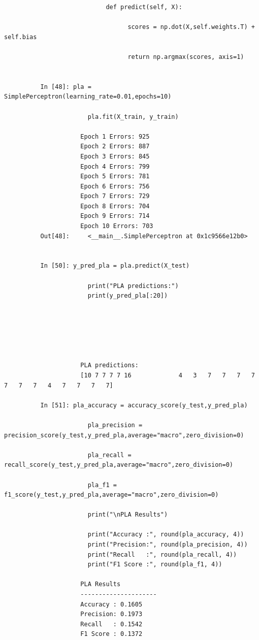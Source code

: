 \documentclass[12pt,a4paper]{article}
\begin{document}
\begin{lstlisting}
                            def predict(self, X):

                                  scores = np.dot(X,self.weights.T) + self.bias

                                  return np.argmax(scores, axis=1)


          In [48]: pla = SimplePerceptron(learning_rate=0.01,epochs=10)

                       pla.fit(X_train, y_train)

                     Epoch 1 Errors: 925
                     Epoch 2 Errors: 887
                     Epoch 3 Errors: 845
                     Epoch 4 Errors: 799
                     Epoch 5 Errors: 781
                     Epoch 6 Errors: 756
                     Epoch 7 Errors: 729
                     Epoch 8 Errors: 704
                     Epoch 9 Errors: 714
                     Epoch 10 Errors: 703
          Out[48]:     <__main__.SimplePerceptron at 0x1c9566e12b0>


          In [50]: y_pred_pla = pla.predict(X_test)

                       print("PLA predictions:")
                       print(y_pred_pla[:20])






                     PLA predictions:
                     [10 7 7 7 7 16             4   3   7   7   7   7   7   7   7   4   7   7   7   7]

          In [51]: pla_accuracy = accuracy_score(y_test,y_pred_pla)

                       pla_precision = precision_score(y_test,y_pred_pla,average="macro",zero_division=0)

                       pla_recall = recall_score(y_test,y_pred_pla,average="macro",zero_division=0)

                       pla_f1 = f1_score(y_test,y_pred_pla,average="macro",zero_division=0)

                       print("\nPLA Results")

                       print("Accuracy :", round(pla_accuracy, 4))
                       print("Precision:", round(pla_precision, 4))
                       print("Recall   :", round(pla_recall, 4))
                       print("F1 Score :", round(pla_f1, 4))

                     PLA Results
                     ---------------------
                     Accuracy : 0.1605
                     Precision: 0.1973
                     Recall   : 0.1542
                     F1 Score : 0.1372


\end{lstlisting}
\end{document}
